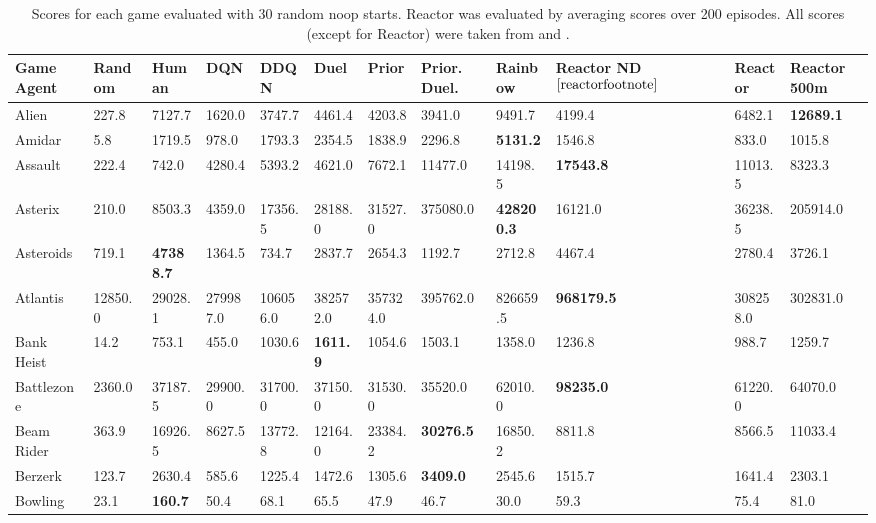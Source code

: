 \documentclass{article}
\begin{document}
\begin{table}[h]
\caption{Scores for each game evaluated with 30 random noop starts. Reactor 
was evaluated by averaging scores over 200 episodes. All scores (except for 
Reactor) were taken from \cite{wang2015dueling} and \cite{rainbow}.}
\label{raw-scores-noop}
\begin{scriptsize}
\begin{sc}
\tiny
\clearpage{}\hspace{-40px}\begin{tabular}{| p{2.4cm} p{0.84cm} p{0.84cm} p{0.84cm} p{0.84cm} p{0.84cm} p{0.84cm} p{0.84cm} p{0.84cm} p{0.84cm} p{0.84cm} p{0.84cm} |}
\hline
Game \/ Agent  & Random & Human & DQN & DDQN & Duel & Prior & Prior. Duel. & Rainbow & Reactor ND $^{\ref{reactorfootnote}}$ & Reactor & Reactor 500m\\
\hline
Alien & 227.8 & 7127.7 & 1620.0 & 3747.7 & 4461.4 & 4203.8 & 3941.0 & 9491.7 & 4199.4 & 6482.1 & {\bf 12689.1}\\
Amidar & 5.8 & 1719.5 & 978.0 & 1793.3 & 2354.5 & 1838.9 & 2296.8 & {\bf 5131.2} & 1546.8 & 833.0 & 1015.8\\
Assault & 222.4 & 742.0 & 4280.4 & 5393.2 & 4621.0 & 7672.1 & 11477.0 & 14198.5 & {\bf 17543.8} & 11013.5 & 8323.3\\
Asterix & 210.0 & 8503.3 & 4359.0 & 17356.5 & 28188.0 & 31527.0 & 375080.0 & {\bf 428200.3} & 16121.0 & 36238.5 & 205914.0\\
Asteroids & 719.1 & {\bf 47388.7} & 1364.5 & 734.7 & 2837.7 & 2654.3 & 1192.7 & 2712.8 & 4467.4 & 2780.4 & 3726.1\\
Atlantis & 12850.0 & 29028.1 & 279987.0 & 106056.0 & 382572.0 & 357324.0 & 395762.0 & 826659.5 & {\bf 968179.5} & 308258.0 & 302831.0\\
Bank Heist & 14.2 & 753.1 & 455.0 & 1030.6 & {\bf 1611.9} & 1054.6 & 1503.1 & 1358.0 & 1236.8 & 988.7 & 1259.7\\
Battlezone & 2360.0 & 37187.5 & 29900.0 & 31700.0 & 37150.0 & 31530.0 & 35520.0 & 62010.0 & {\bf 98235.0} & 61220.0 & 64070.0\\
Beam Rider & 363.9 & 16926.5 & 8627.5 & 13772.8 & 12164.0 & 23384.2 & {\bf 30276.5} & 16850.2 & 8811.8 & 8566.5 & 11033.4\\
Berzerk & 123.7 & 2630.4 & 585.6 & 1225.4 & 1472.6 & 1305.6 & {\bf 3409.0} & 2545.6 & 1515.7 & 1641.4 & 2303.1\\
Bowling & 23.1 & {\bf 160.7} & 50.4 & 68.1 & 65.5 & 47.9 & 46.7 & 30.0 & 59.3 & 75.4 & 81.0\\

\end{tabular}
\end{sc}
\end{scriptsize}
\end{table}
\end{document}

